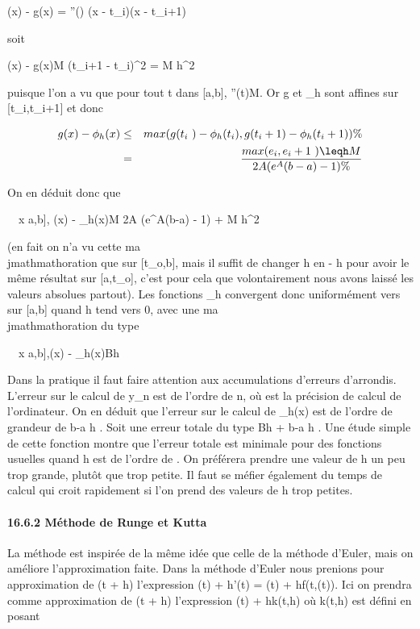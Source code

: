 \documentclass[]{article}
\begin{document}
\phi(x) - g(x) = \phi''(\xi) (x - t_i)(x - t_i+1)

soit

\phi(x) - g(x)\leq M (t_i+1 -
t_i)^2  = M h^2

puisque l'on a vu que pour tout t dans {[}a,b{]},
\phi''(t)\leq M. Or g et \phi_h sont affines sur
{[}t_i,t_i+1{]} et donc

\begin{align*} g(x) -
\phi_h(x)& \leq&
max(g(t_i~) -
\phi_h(t_i),g(t_i+1) -
\phi_h(t_i+1))\%&
\\ & =&
max(e_i,e_i+1~)
\leqh M \over 2A
(e^A(b-a) - 1) \%& \\
\end{align*}

On en déduit donc que

\forall~~x \in {[}a,b{]}, \phi(x) -
\phi_h(x)\leqh M \over
2A (e^A(b-a) - 1) + M h^2 

(en fait on n'a vu cette ma\\jmathmathoration que sur {[}t_o,b{]}, mais
il suffit de changer h en - h pour avoir le même résultat sur
{[}a,t_o{]}, c'est pour cela que volontairement nous avons
laissé les valeurs absolues partout). Les fonctions \phi_h
convergent donc uniformément vers \phi sur {[}a,b{]} quand h tend vers 0,
avec une ma\\jmathmathoration du type

\forall~~x \in {[}a,b{]},\phi(x) -
\phi_h(x)\leq Bh

Dans la pratique il faut faire attention aux accumulations d'erreurs
d'arrondis. L'erreur sur le calcul de y_n est de l'ordre de n\epsilon,
où \epsilon est la précision de calcul de l'ordinateur. On en déduit que
l'erreur sur le calcul de \phi_h(x) est de l'ordre de grandeur de
 b-a \over h \epsilon. Soit une erreur totale du type Bh +
b-a \over h \epsilon. Une étude simple de cette fonction
montre que l'erreur totale est minimale pour des fonctions usuelles
quand h est de l'ordre de \sqrt\epsilon. On préférera
prendre une valeur de h un peu trop grande, plutôt que trop petite. Il
faut se méfier également du temps de calcul qui croit rapidement si l'on
prend des valeurs de h trop petites.

\paragraph{16.6.2 Méthode de Runge et Kutta}

La méthode est inspirée de la même idée que celle de la méthode d'Euler,
mais on améliore l'approximation faite. Dans la méthode d'Euler nous
prenions pour approximation de \phi(t + h) l'expression \phi(t) + h\phi'(t) =
\phi(t) + hf(t,\phi(t)). Ici on prendra comme approximation de \phi(t + h)
l'expression \phi(t) + hk(t,h) où k(t,h) est défini en posant
\end{document}
